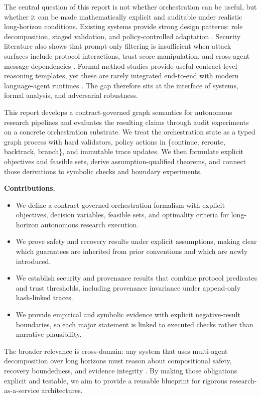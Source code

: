 \documentclass{article} %
\begin{document}
The central question of this report is not whether orchestration can be useful, but whether it can be made mathematically explicit and auditable under realistic long-horizon conditions. Existing systems provide strong design patterns: role decomposition, staged validation, and policy-controlled adaptation \citep{song2026,sawant2026,chang2025,marozau2025,medeiros2025}. Security literature also shows that prompt-only filtering is insufficient when attack surfaces include protocol interactions, trust score manipulation, and cross-agent message dependencies \citep{ferrag2026,ismail2025,gao2025,han2025}. Formal-method studies provide useful contract-level reasoning templates, yet these are rarely integrated end-to-end with modern language-agent runtimes \citep{song2026b,dinu2024,glas2026}. The gap therefore sits at the interface of systems, formal analysis, and adversarial robustness.

This report develops a contract-governed graph semantics for autonomous research pipelines and evaluates the resulting claims through audit experiments on a concrete orchestration substrate. We treat the orchestration state as a typed graph process with hard validators, policy actions in \{continue, reroute, backtrack, branch\}, and immutable trace updates. We then formulate explicit objectives and feasible sets, derive assumption-qualified theorems, and connect those derivations to symbolic checks and boundary experiments.

\textbf{Contributions.}
\begin{itemize}
\item We define a contract-governed orchestration formalism with explicit objectives, decision variables, feasible sets, and optimality criteria for long-horizon autonomous research execution.
\item We prove safety and recovery results under explicit assumptions, making clear which guarantees are inherited from prior conventions and which are newly introduced.
\item We establish security and provenance results that combine protocol predicates and trust thresholds, including provenance invariance under append-only hash-linked traces.
\item We provide empirical and symbolic evidence with explicit negative-result boundaries, so each major statement is linked to executed checks rather than narrative plausibility.
\end{itemize}

The broader relevance is cross-domain: any system that uses multi-agent decomposition over long horizons must reason about compositional safety, recovery boundedness, and evidence integrity \citep{xin2025,reddy2025,hou2025,dong2025,shao2025}. By making those obligations explicit and testable, we aim to provide a reusable blueprint for rigorous research-as-a-service architectures.
\end{document}
